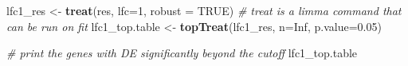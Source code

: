 \documentclass[
]{book}
\newenvironment{Shaded}{\begin{snugshade}}{\end{snugshade}}
\newcommand{\AttributeTok}[1]{\textcolor[rgb]{0.13,0.29,0.53}{#1}}
\newcommand{\CommentTok}[1]{\textcolor[rgb]{0.56,0.35,0.01}{\textit{#1}}}
\newcommand{\ConstantTok}[1]{\textcolor[rgb]{0.56,0.35,0.01}{#1}}
\newcommand{\DecValTok}[1]{\textcolor[rgb]{0.00,0.00,0.81}{#1}}
\newcommand{\FloatTok}[1]{\textcolor[rgb]{0.00,0.00,0.81}{#1}}
\newcommand{\FunctionTok}[1]{\textcolor[rgb]{0.13,0.29,0.53}{\textbf{#1}}}
\newcommand{\NormalTok}[1]{#1}
\newcommand{\OtherTok}[1]{\textcolor[rgb]{0.56,0.35,0.01}{#1}}
\begin{document}
\begin{Shaded}
\begin{Highlighting}[]
\NormalTok{lfc1\_res }\OtherTok{\textless{}{-}} \FunctionTok{treat}\NormalTok{(res,}
               \AttributeTok{lfc=}\DecValTok{1}\NormalTok{,}
               \AttributeTok{robust =} \ConstantTok{TRUE}\NormalTok{)}
\CommentTok{\# treat is a limma command that can be run on fit}
\NormalTok{lfc1\_top.table }\OtherTok{\textless{}{-}} \FunctionTok{topTreat}\NormalTok{(lfc1\_res, }\AttributeTok{n=}\ConstantTok{Inf}\NormalTok{, }\AttributeTok{p.value=}\FloatTok{0.05}\NormalTok{)}

\CommentTok{\# print the genes with DE significantly beyond the cutoff}
\NormalTok{lfc1\_top.table}
\end{Highlighting}
\end{Shaded}
\end{document}
